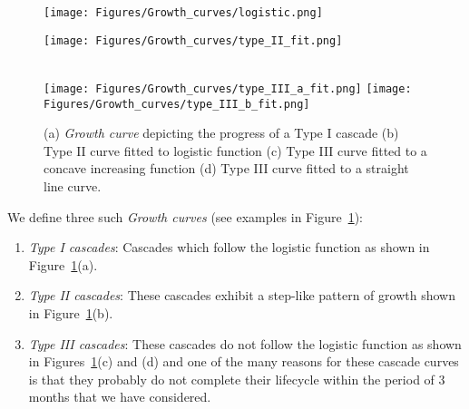 \documentclass[smallextended]{svjour3}       %
\theoremstyle{definition}
\begin{document}
\begin{figure}[!t]
	\centering
	\hfill
	\begin{minipage}{0.25\textwidth}%
		\texttt{[image: Figures/Growth\_curves/logistic.png]}
		\hspace*{2.25cm}\subcaption{}
	\end{minipage}
	\hfill
	\begin{minipage}{0.5\textwidth}
		\texttt{[image: Figures/Growth\_curves/type\_II\_fit.png]}
		\hspace*{2.25cm}\subcaption{}
	\end{minipage}
	\hfill
	\\
	\hfill
	\texttt{[image: Figures/Growth\_curves/type\_III\_a\_fit.png]}
	\hspace*{2.25cm}\subcaption{}
	\endminipage 
	\hfill
	\texttt{[image: Figures/Growth\_curves/type\_III\_b\_fit.png]}
	\hspace*{2.25cm}\subcaption{}
	\endminipage\hfill
	\caption{(a) \textit{Growth curve} depicting the progress of a Type I cascade (b) Type II curve fitted to logistic function (c) Type III curve fitted to a concave increasing function (d) Type III curve fitted to a straight line curve.}
	\label{fig:types_cascades}
\end{figure}



We define three such \textit{Growth curves} (see examples in Figure~\ref{fig:types_cascades}):
\begin{enumerate}
	\item \textit{Type I cascades}: Cascades which follow the logistic function as shown in Figure~\ref{fig:types_cascades}(a).
	\item \textit{Type II cascades}: These cascades exhibit a step-like pattern of growth shown in Figure~\ref{fig:types_cascades}(b).
	\item \textit{Type III cascades}: These cascades do not follow the logistic function as shown in Figures~\ref{fig:types_cascades}(c) and (d) and one of the many reasons for these cascade curves is that they probably do not complete their lifecycle within the period of 3 months that we have considered.
\end{enumerate}
\end{document}
